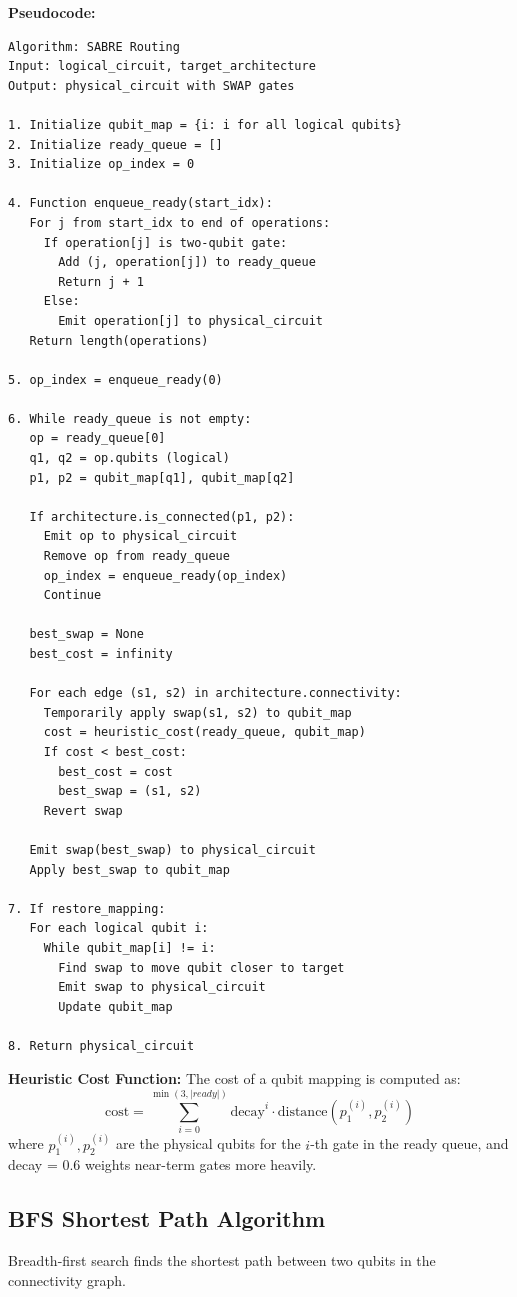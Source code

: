 \textbf{Pseudocode:}
\begin{verbatim}
Algorithm: SABRE Routing
Input: logical_circuit, target_architecture
Output: physical_circuit with SWAP gates

1. Initialize qubit_map = {i: i for all logical qubits}
2. Initialize ready_queue = []
3. Initialize op_index = 0

4. Function enqueue_ready(start_idx):
   For j from start_idx to end of operations:
     If operation[j] is two-qubit gate:
       Add (j, operation[j]) to ready_queue
       Return j + 1
     Else:
       Emit operation[j] to physical_circuit
   Return length(operations)

5. op_index = enqueue_ready(0)

6. While ready_queue is not empty:
   op = ready_queue[0]
   q1, q2 = op.qubits (logical)
   p1, p2 = qubit_map[q1], qubit_map[q2]
   
   If architecture.is_connected(p1, p2):
     Emit op to physical_circuit
     Remove op from ready_queue
     op_index = enqueue_ready(op_index)
     Continue
   
   best_swap = None
   best_cost = infinity
   
   For each edge (s1, s2) in architecture.connectivity:
     Temporarily apply swap(s1, s2) to qubit_map
     cost = heuristic_cost(ready_queue, qubit_map)
     If cost < best_cost:
       best_cost = cost
       best_swap = (s1, s2)
     Revert swap
   
   Emit swap(best_swap) to physical_circuit
   Apply best_swap to qubit_map

7. If restore_mapping:
   For each logical qubit i:
     While qubit_map[i] != i:
       Find swap to move qubit closer to target
       Emit swap to physical_circuit
       Update qubit_map

8. Return physical_circuit
\end{verbatim}

\textbf{Heuristic Cost Function:}
The cost of a qubit mapping is computed as:
$$\text{cost} = \sum_{i=0}^{\min(3, |ready|)} \text{decay}^i \cdot \text{distance}(p_1^{(i)}, p_2^{(i)})$$
where $p_1^{(i)}, p_2^{(i)}$ are the physical qubits for the $i$-th gate in the ready queue, and decay = 0.6 weights near-term gates more heavily.

\subsection{BFS Shortest Path Algorithm}
Breadth-first search finds the shortest path between two qubits in the connectivity graph.

